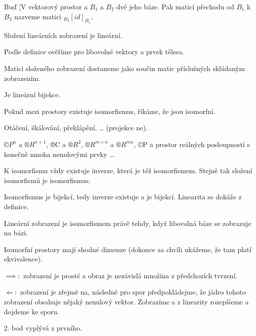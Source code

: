 \documentclass[12pt]{article}					%
\begin{document}
    \begin{definice}
            Buď ¦V vektorový prostor a $B_1$ a $B_2$ dvě jeho báze. Pak maticí přechodu od $B_1$ k $B_2$ nazveme matici $_{B_2}[id]_{B_1}$.
    \end{definice}

    \begin{tvrzeni}
        Složení lineárních zobrazení je lineární.
        \begin{dukazin}
            Podle definice ověříme pro libovolné vektory a prvek tělesa.
        \end{dukazin}
    \end{tvrzeni}

    \begin{veta}
        Matici složeného zobrazení dostaneme jako součin matic příslušných skládaným zobrazením.
    \end{veta}


    \begin{definice}[Isomorfismus]
        Je lineární bijekce.

        Pokud mezi prostory existuje isomorfismus, říkáme, že jsou isomorfní.
    \end{definice}

    \begin{priklady}
        Otáčení, škálování, překlápění, … (projekce ne).

        $©P^n$ a $®R^{n+1}$, ®C a $®R^2$, $®R^{m\times n}$ a $®R^{mn}$, ©P a prostor reálných posloupností s konečně mnoha nenulovými prvky …
    \end{priklady}

    \begin{tvrzeni}
        K isomorfismu vždy existuje inverze, která je též isomorfismem. Stejně tak složení isomorfismů je isomorfismus.

        \begin{dukazin}
            Isomorfismus je bijekcí, tedy inverze existuje a je bijekcí. Linearita se dokáže z definice.
        \end{dukazin}
    \end{tvrzeni}

    \begin{tvrzeni}
        Lineární zobrazení je isomorfismem právě tehdy, když libovolná báze se zobrazuje na bázi.

        Isomorfní prostory mají shodné dimenze (dokonce za chvíli ukážeme, že tam platí ekvivalence).

        \begin{dukazin}
            $\implies:$ zobrazení je prosté a obraz je nezávislá množina z předchozích tvrzení.

            $\Leftarrow:$ zobrazení je zřejmě na, následně pro spor předpokládejme, že jádro tohoto zobrazení obsahuje nějaký nenulový vektor. Zobrazíme a z linearity rozepíšeme a dojdeme ke sporu.

            2. bod vyplývá z prvního.
        \end{dukazin}
    \end{tvrzeni}
\end{document}
